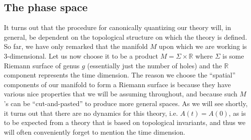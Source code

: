 \documentclass[12pt]{article}
\begin{document}
\subsection*{The phase space}

It turns out that the procedure for canonically quantizing our theory will, in general, be dependent on the topological structure on which the theory is defined. So far, we have only remarked that the manifold $M$ upon which we are working is 3-dimensional. Let us now choose it to be a product $M=\Sigma\times\mathbb{R}$ where $\Sigma$ is some Riemann surface of genus $g$ (essentially just the number of holes) and the $\mathbb{R}$ component represents the time dimension. The reason we choose the ``spatial'' components of our manifold to form a Riemann surface is because they have various nice properties that we will be assuming throughout, and because such $M$'s can be ``cut-and-pasted'' to produce more general spaces. As we will see shortly, it turns out that there are no dynamics for this theory, i.e. $A(t) = A(0)$, as is to be expected from a theory that is based on topological invariants, and thus we will often conveniently forget to mention the time dimension.
\end{document}

